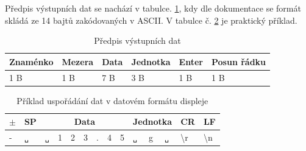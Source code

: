 
Předpis výstupních dat se nachází v tabulce. \ref{tabos}, kdy dle dokumentace se formát skládá ze 14 bajtů zakódovaných v ASCII. V tabulce č. \ref{jouu} je praktický příklad.


\begin{table} [!h]
    \centering
    \begin{tabular}{|l|l|l|l|l|l|}
    \hline
         Znaménko    & Mezera & Data &  Jednotka & Enter & Posun řádku \\ \hline
         1 B & 1 B           & 7 B           & 3 B &1 B&1 B\\ \hline
    \end{tabular}
    \caption{Předpis výstupních dat}
    \label{tabos}
\end{table}





\begin{table}[h]
\centering
\begin{tabular}{|p{0.6cm}|p{0.6cm}|p{0.6cm}|p{0.6cm}|p{0.6cm}|p{0.6cm}|p{0.6cm}|p{0.6cm}|p{0.6cm}|p{0.6cm}|p{0.6cm}|p{0.6cm}|p{0.6cm}|p{0.6cm}|}
\hline
\(\pm\) & SP & \multicolumn{7}{c|}{Data} & \multicolumn{3}{c|}{Jednotka} & CR & LF \\ \hline
- & \verb|␣| & \verb|␣| & 1 & 2 & 3 & . & 4 & 5 & \verb|␣| & g & \verb|␣| & \textbackslash{r} & \textbackslash{n} \\ \hline
\end{tabular}
\caption{Příklad uspořádání dat v datovém formátu displeje}
\label{jouu}
\end{table}

